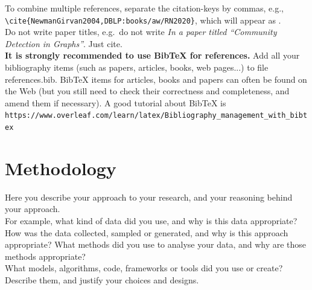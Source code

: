 \documentclass[a4paper,12pt]{Classes/RoboticsLaTeX}
\begin{document}
	\noindent To combine multiple references, separate the citation-keys by commas, e.g.,\\ 
	\noindent \verb#\cite{NewmanGirvan2004,DBLP:books/aw/RN2020}#, which will appear as \cite{NewmanGirvan2004,DBLP:books/aw/RN2020}.\\
	
	\noindent Do not write paper titles, e.g.~do not write {\em In a paper titled ``Community Detection in Graphs''}. Just cite.\\
	
	
	\textbf{It is strongly recommended to use BibTeX for references.} Add all your bibliography items (such as papers, articles, books, web pages...) to file references.bib. BibTeX items for articles, books and papers can often be found on the Web (but you still need to check their correctness and completeness, and amend them if necessary). A good tutorial about BibTeX is\\
	\verb#https://www.overleaf.com/learn/latex/Bibliography_management_with_bibtex#
	
	\chapter{Methodology}
	\label{chap:methodology}
	
	Here you describe your approach to your research, and your reasoning behind your approach.\\
	
	For example, what kind of data did you use, and why is this data appropriate? How was the data collected, sampled or generated, and why is this approach appropriate? What methods did you use to analyse your data, and why are those methods appropriate?\\
	
	What models, algorithms, code, frameworks or tools did you use or create? Describe them, and justify your choices and designs. \\
	
\end{document}
